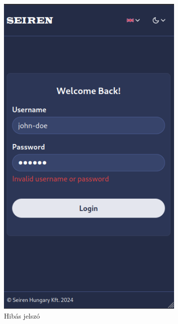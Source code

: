 \documentclass[a4paper]{article}
\begin{document}
\begin{figure}[ht]
    \centering
    \begin{subfigure}[b]{0.45\textwidth}
        \centering
        \includegraphics[clip, trim=0 30 0 0, height=0.4\textheight]{images/login_wrong_passwd.png}
        \caption{Hibás jelszó}
        \label{fig:login_wrong_passwd}
    \end{subfigure}
    \hfill
    \begin{subfigure}[b]{0.45\textwidth}
        \centering

\end{subfigure}
\end{figure}
\end{document}
